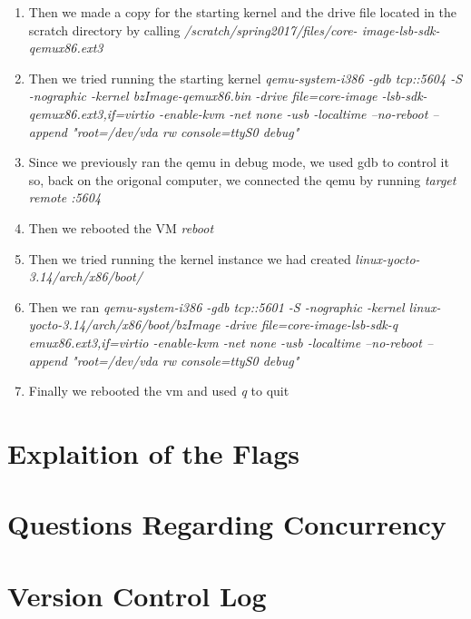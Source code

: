 \begin{enumerate}
    \item Then we made a copy for the starting kernel and the drive file located in the scratch directory by calling \textit{/scratch/spring2017/files/core-    image-lsb-sdk-qemux86.ext3}
    \item Then we tried running the starting kernel \textit{qemu-system-i386 -gdb tcp::5604 -S -nographic -kernel bzImage-qemux86.bin -drive file=core-image    -lsb-sdk-qemux86.ext3,if=virtio -enable-kvm -net none -usb -localtime --no-reboot --append "root=/dev/vda rw console=ttyS0 debug"}
    \item Since we previously ran the qemu in debug mode, we used gdb to control it so, back on the origonal computer, we connected the qemu by running \textit{target remote :5604}
    \item Then we rebooted the VM \textit{reboot}
    \item Then we tried running the kernel instance we had created \textit{linux-yocto-3.14/arch/x86/boot/}
    \item Then we ran \textit{qemu-system-i386 -gdb tcp::5601 -S -nographic -kernel linux-yocto-3.14/arch/x86/boot/bzImage  -drive file=core-image-lsb-sdk-q    emux86.ext3,if=virtio -enable-kvm -net none -usb -localtime --no-reboot --append "root=/dev/vda rw console=ttyS0 debug"}
    \item Finally we rebooted the vm and used \textit{q} to quit
\end{enumerate}
\section{Explaition of the Flags}

\section{Questions Regarding Concurrency}

\section{Version Control Log}



